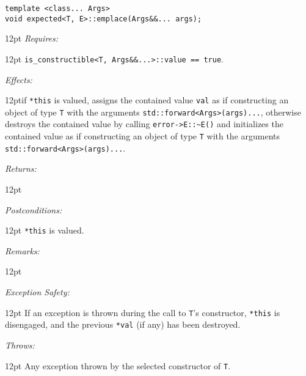 \documentclass[a4paper,10pt]{article}
\newcommand{\cpp}[1]{\lstinline{#1}}
\newcommand{\wordingItem}[1]{\noindent\textit{#1:}}
\newenvironment{wordingTextItem}[1]{\wordingItem{#1}\vspace{7pt}\noindent\begin{adjustwidth}{12pt}{}}{\vspace{7pt}\end{adjustwidth}}
\newenvironment{wordingPara}{\begin{adjustwidth}{12pt}{}}{\end{adjustwidth}}
\begin{document}
\begin{lstlisting}[xleftmargin=0pt]
template <class... Args>
void expected<T, E>::emplace(Args&&... args); 
\end{lstlisting}
\begin{wordingPara}
\begin{wordingTextItem}{Requires}
\cpp{is_constructible<T, Args&&...>::value == true}.
\end{wordingTextItem}
\begin{wordingTextItem}{Effects}if \cpp{*this} is valued, assigns the contained value \cpp{val} as if constructing an object of type \cpp{T} with the arguments \cpp{std::forward<Args>(args)...}, otherwise \\
destroys the contained value by calling \cpp{error->E::~E()} and  initializes the contained value as if constructing an object of type \cpp{T} with the arguments \cpp{std::forward<Args>(args)...}.
\end{wordingTextItem}
\begin{wordingTextItem}{Returns}
\end{wordingTextItem}
\begin{wordingTextItem}{Postconditions}
\cpp{*this} is valued.
\end{wordingTextItem}
\begin{wordingTextItem}{Remarks}
\end{wordingTextItem}
\begin{wordingTextItem}{Exception Safety}
If an exception is thrown during the call to \cpp{T}'s constructor, \cpp{*this} is disengaged, and the previous \cpp{*val} (if any) has been destroyed.
\end{wordingTextItem}
\begin{wordingTextItem}{Throws}
Any exception thrown by the selected constructor of \cpp{T}.
\end{wordingTextItem}
\end{wordingPara}
\end{document}
